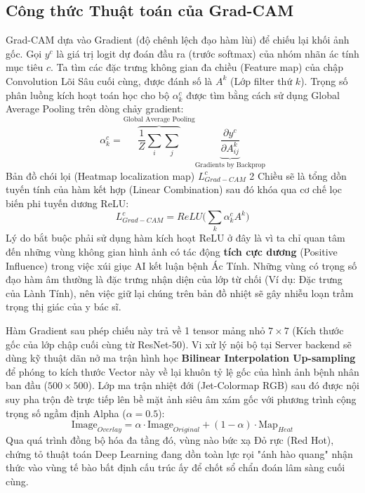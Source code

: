 \documentclass[conference,a4paper]{IEEEtran}
\begin{document}
\subsection{Công thức Thuật toán của Grad-CAM}
Grad-CAM \cite{gradcam} dựa vào Gradient (độ chênh lệch đạo hàm lùi) để chiếu lại khối ảnh gốc.
Gọi $y^c$ là giá trị logit dự đoán đầu ra (trước softmax) của nhóm nhãn ác tính mục tiêu $c$. Ta tìm các đặc trưng không gian đa chiều (Feature map) của chập Convolution Lõi Sâu cuối cùng, được đánh số là $A^k$ (Lớp filter thứ $k$).
Trọng số phân luồng kích hoạt toán học cho bộ $\alpha_k^c$ được tìm bằng cách sử dụng Global Average Pooling trên dòng chảy gradient:
\begin{equation}
\alpha_k^c = \overbrace{\frac{1}{Z} \sum_{i} \sum_{j}}^{\text{Global Average Pooling}} \underbrace{\frac{\partial y^c}{\partial A_{ij}^k}}_{\text{Gradients by Backprop}}
\end{equation}
Bản đồ chói lọi (Heatmap localization map) $L_{Grad-CAM}^c$ 2 Chiều sẽ là tổng dồn tuyến tính của hàm kết hợp (Linear Combination) sau đó khóa qua cơ chế lọc biến phi tuyến dương ReLU:
\begin{equation}
L_{Grad-CAM}^c = ReLU \Big( \sum_k \alpha_k^c A^k \Big)
\end{equation}
Lý do bắt buộc phải sử dụng hàm kích hoạt ReLU ở đây là vì ta chỉ quan tâm đến những vùng không gian hình ảnh có tác động \textbf{tích cực dương} (Positive Influence) trong việc xúi giục AI kết luận bệnh Ác Tính. Những vùng có trọng số đạo hàm âm thường là đặc trưng nhận diện của lớp từ chối (Ví dụ: Đặc trưng của Lành Tính), nên việc giữ lại chúng trên bản đồ nhiệt sẽ gây nhiễu loạn trầm trọng thị giác của y bác sĩ.

Hàm Gradient sau phép chiếu này trả về 1 tensor mảng nhỏ $7 \times 7$ (Kích thước gốc của lớp chập cuối cùng từ ResNet-50). Vi xử lý nội bộ tại Server backend sẽ dùng kỹ thuật dãn nở ma trận hình học \textbf{Bilinear Interpolation Up-sampling} để phóng to kích thước Vector này về lại khuôn tỷ lệ gốc của hình ảnh bệnh nhân ban đầu ($500 \times 500$). Lớp ma trận nhiệt đới (Jet-Colormap RGB) sau đó được nội suy pha trộn đè trực tiếp lên bề mặt ảnh siêu âm xám gốc với phương trình cộng trọng số ngầm định Alpha ($\alpha = 0.5$):
\begin{equation}
\text{Image}_{Overlay} = \alpha \cdot \text{Image}_{Original} + (1-\alpha) \cdot \text{Map}_{Heat}
\end{equation}
Qua quá trình đồng bộ hóa đa tầng đó, vùng nào bức xạ Đỏ rực (Red Hot), chứng tỏ thuật toán Deep Learning đang dồn toàn lực rọi "ánh hào quang" nhận thức vào vùng tế bào bất định cấu trúc ấy để chốt sổ chẩn đoán lâm sàng cuối cùng.
\end{document}

